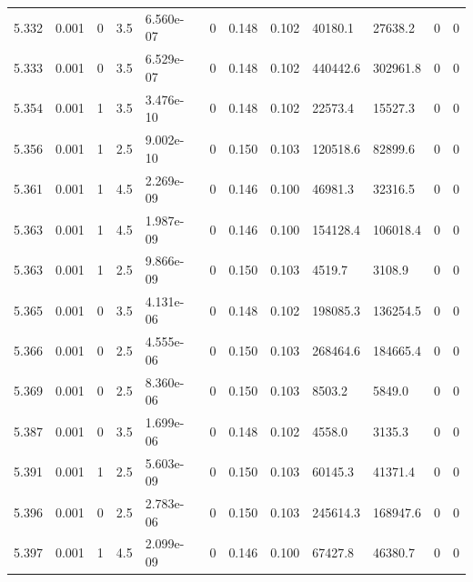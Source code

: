 \documentclass[preview]{standalone}
\begin{document}
{{{{{{{{{{{{\begin{tabular}{L{1.2cm}C{1.2cm} C{0.3cm}C{0.5cm} C{1.4cm}C{1.4cm} C{1.4cm}C{1.4cm} C{1.6cm}C{1.6cm} C{1.6cm}C{1.6cm}}
  5.332  &  0.001  & 0     & 3.5 &  6.560e-07  & 0  &  0.148&   0.102& 40180.1 & 27638.2   &  0 & 0  \\ 
  5.333  &  0.001  & 0     & 3.5 &  6.529e-07  & 0  &  0.148&   0.102& 440442.6 & 302961.8   &  0 & 0  \\ 
  5.354  &  0.001  & 1     & 3.5 &  3.476e-10  & 0  &  0.148&   0.102& 22573.4 & 15527.3   &  0 & 0  \\ 
  5.356  &  0.001  & 1     & 2.5 &  9.002e-10  & 0  &  0.150&   0.103& 120518.6 & 82899.6   &  0 & 0  \\ 
  5.361  &  0.001  & 1     & 4.5 &  2.269e-09  & 0  &  0.146&   0.100& 46981.3 & 32316.5   &  0 & 0  \\ 
  5.363  &  0.001  & 1     & 4.5 &  1.987e-09  & 0  &  0.146&   0.100& 154128.4 & 106018.4   &  0 & 0  \\ 
  5.363  &  0.001  & 1     & 2.5 &  9.866e-09  & 0  &  0.150&   0.103& 4519.7 & 3108.9   &  0 & 0  \\ 
  5.365  &  0.001  & 0     & 3.5 &  4.131e-06  & 0  &  0.148&   0.102& 198085.3 & 136254.5   &  0 & 0  \\ 
  5.366  &  0.001  & 0     & 2.5 &  4.555e-06  & 0  &  0.150&   0.103& 268464.6 & 184665.4   &  0 & 0  \\ 
  5.369  &  0.001  & 0     & 2.5 &  8.360e-06  & 0  &  0.150&   0.103& 8503.2 & 5849.0   &  0 & 0  \\ 
  5.387  &  0.001  & 0     & 3.5 &  1.699e-06  & 0  &  0.148&   0.102& 4558.0 & 3135.3   &  0 & 0  \\ 
  5.391  &  0.001  & 1     & 2.5 &  5.603e-09  & 0  &  0.150&   0.103& 60145.3 & 41371.4   &  0 & 0  \\ 
  5.396  &  0.001  & 0     & 2.5 &  2.783e-06  & 0  &  0.150&   0.103& 245614.3 & 168947.6   &  0 & 0  \\ 
  5.397  &  0.001  & 1     & 4.5 &  2.099e-09  & 0  &  0.146&   0.100& 67427.8 & 46380.7   &  0 & 0  \\ 
\hline 
\end{tabular} 

}}}}}}}}}}}}
\end{document}
